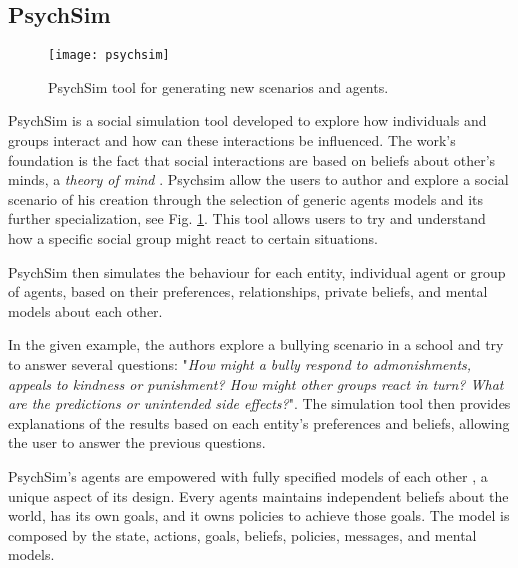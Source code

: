 \subsection{PsychSim}
\label{sec:psychsim}
\begin{figure}
  \centering
    \texttt{[image: psychsim]}
  \caption{PsychSim tool for generating new scenarios and agents.}
  \label{fig:psychsim}
\end{figure}
PsychSim \cite{marsella:psychsim} is a social simulation tool developed to explore how individuals and groups interact and how can these interactions be influenced.
The work's foundation is the fact that social interactions are based on beliefs about other's minds, a \textit{theory of mind} \cite{whiten:theoryofmind}.
Psychsim allow the users to author and explore a social scenario of his creation through the selection of generic agents models and its further specialization, see Fig. \ref{fig:psychsim}.
This tool allows users to try and understand how a specific social group might react to certain situations.

PsychSim then simulates the behaviour for each entity, individual agent or group of agents, based on their preferences, relationships, private beliefs, and mental models about each other.

In the given example, the authors explore a bullying scenario in a school and try to answer several questions:
"\textit{How might a bully respond to admonishments, appeals to kindness or punishment? 
How might other groups react in turn? 
What are the predictions or unintended side effects?}".
The simulation tool then provides explanations of the results based on each entity's preferences and beliefs, allowing the user to answer the previous questions.

PsychSim's agents are empowered with fully specified models of each other \cite{pynadath:modellingtheoryofmind}, a unique aspect of its design. Every agents maintains independent beliefs about the world, has its own goals, and it owns policies to achieve those goals. The model is composed by the state, actions, goals, beliefs, policies, messages, and mental models.

